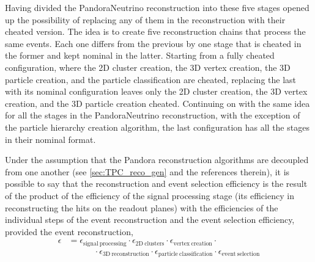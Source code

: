 Having divided the PandoraNeutrino reconstruction into these five stages opened up the possibility of replacing any of them in the reconstruction with their cheated version. The idea is to create five reconstruction chains that process the same events. Each one differs from the previous by one stage that is cheated in the former and kept nominal in the latter. Starting from a fully cheated configuration, where the 2D cluster creation, the 3D vertex creation, the 3D particle creation, and the particle classification are cheated, replacing the last with its nominal configuration leaves only the 2D cluster creation, the 3D vertex creation, and the 3D particle creation cheated. Continuing on with the same idea for all the stages in the PandoraNeutrino reconstruction, with the exception of the particle hierarchy creation algorithm, the last configuration has all the stages in their nominal format. 

Under the assumption that the Pandora reconstruction algorithms are decoupled from one another (see \autoref{sec:TPC_reco_gen} and the references therein), it is possible to say that the reconstruction and event selection efficiency is the result of the product of the efficiency of the signal processing stage (its efficiency in reconstructing the hits on the readout planes) with the efficiencies of the individual steps of the event reconstruction and the event selection efficiency, provided the event reconstruction, \begin{equation}
    \begin{aligned}
        \epsilon &= 
        \epsilon_\mathrm{signal\ processing} \cdot 
        \epsilon_\mathrm{2D\ clusters} \cdot 
        \epsilon_\mathrm{vertex\ creation} \cdot \\
        &\quad\quad\quad\cdot
        \epsilon_\mathrm{3D\ reconstruction} \cdot 
        \epsilon_\mathrm{particle\ classification} \cdot 
        \epsilon_\mathrm{event\ selection}
    \end{aligned}
\end{equation} 

